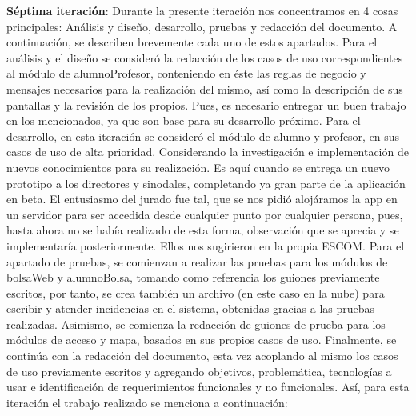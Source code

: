 \noindent
\newline
\textbf{Séptima iteración}: Durante la presente iteración nos concentramos en 4 cosas principales: Análisis y diseño, desarrollo, pruebas y redacción del documento. A continuación, se describen brevemente cada uno de estos apartados.
\newline
\newline
Para el análisis y el diseño se consideró la redacción de los casos de uso correspondientes al módulo de alumnoProfesor, conteniendo en éste las reglas de negocio y mensajes necesarios para la realización del mismo, así como la descripción de sus pantallas y la revisión de los propios. Pues, es necesario entregar un buen trabajo en los mencionados, ya que son base para su desarrollo próximo.
\newline
\newline
Para el desarrollo, en esta iteración se consideró el módulo de alumno y profesor, en sus casos de uso de alta prioridad. Considerando la investigación e implementación de nuevos conocimientos para su realización. Es aquí cuando se entrega un nuevo prototipo a los directores y sinodales, completando ya gran parte de la aplicación en beta. El entusiasmo del jurado fue tal, que se nos pidió alojáramos la app en un servidor para ser accedida desde cualquier punto por cualquier persona, pues, hasta ahora no se había realizado de esta forma, observación que se aprecia y se implementaría posteriormente. Ellos nos sugirieron en la propia ESCOM.
\newline
\newline
Para el apartado de pruebas, se comienzan a realizar las pruebas para los módulos de bolsaWeb y alumnoBolsa, tomando como referencia los guiones previamente escritos, por tanto, se crea también un archivo (en este caso en la nube) para escribir y atender incidencias en el sistema, obtenidas gracias a las pruebas realizadas. 
\newline
Asimismo, se comienza la redacción de guiones de prueba para los módulos de acceso y mapa, basados en sus propios casos de uso. 
\newline
\newline
Finalmente, se continúa con la redacción del documento, esta vez acoplando al mismo los casos de uso previamente escritos y agregando objetivos, problemática, tecnologías a usar e identificación de requerimientos funcionales y no funcionales.
\newline
Así, para esta iteración el trabajo realizado se menciona a continuación:

